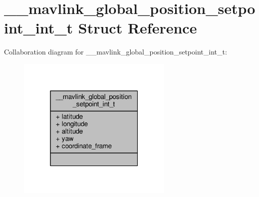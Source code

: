 \hypertarget{struct____mavlink__global__position__setpoint__int__t}{\section{\+\_\+\+\_\+mavlink\+\_\+global\+\_\+position\+\_\+setpoint\+\_\+int\+\_\+t Struct Reference}
\label{struct____mavlink__global__position__setpoint__int__t}
}


Collaboration diagram for \+\_\+\+\_\+mavlink\+\_\+global\+\_\+position\+\_\+setpoint\+\_\+int\+\_\+t\+:
\nopagebreak
\begin{figure}[H]
\begin{center}
\leavevmode
\includegraphics[width=211pt]{struct____mavlink__global__position__setpoint__int__t__coll__graph}
\end{center}
\end{figure}

